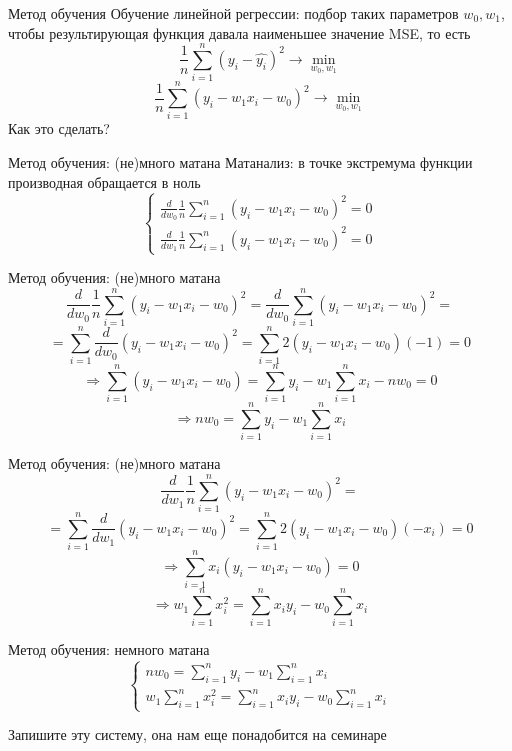 \documentclass[aspectratio=169, professionalfonts]{beamer}
\begin{document}
\begin{frame}{Метод обучения}
    Обучение линейной регрессии: подбор таких параметров \( w_0, w_1 \), чтобы результирующая
    функция давала наименьшее значение MSE, то есть
    {\Large
        \[ \frac{1}{n} \sum_{i=1}^n {(y_i - \hat{y_i})}^2 \rightarrow \min_{w_0, w_1} \]
        \pause
        \[ \frac{1}{n} \sum_{i=1}^n {(y_i - w_1 x_i - w_0 )}^2 \rightarrow \min_{w_0, w_1} \]
    }
    Как это сделать?
\end{frame}

\begin{frame}{Метод обучения: (не)много матана}
    Матанализ: в точке экстремума функции производная обращается в ноль
    {\LARGE \[
        \begin{cases}
            \frac{d}{dw_0} \frac{1}{n} \sum_{i=1}^n {(y_i - w_1 x_i - w_0)}^2 = 0 \\
            \frac{d}{dw_1} \frac{1}{n} \sum_{i=1}^n {(y_i - w_1 x_i - w_0)}^2 = 0 
        \end{cases}
    \]}
\end{frame}

\begin{frame}{Метод обучения: (не)много матана}
    \large
    \[
        \frac{d}{dw_0} \frac{1}{n} \sum_{i=1}^n {(y_i - w_1 x_i - w_0)}^2 =
        \frac{d}{dw_0} \sum_{i=1}^n {(y_i - w_1 x_i - w_0)}^2 =
    \]
    \pause
    \[
        = \sum_{i=1}^n \frac{d}{dw_0} {(y_i - w_1 x_i - w_0)}^2 =
        \sum_{i=1}^n 2 {(y_i - w_1 x_i - w_0)(-1)} = 0
    \]
    \pause
    \[
        \Rightarrow \sum_{i=1}^n (y_i - w_1 x_i - w_0) =
        \sum_{i=1}^n y_i - w_1 \sum_{i=1}^n x_i - n w_0 = 0
    \]
    \pause
    \[
        \Rightarrow n w_0 = \sum_{i=1}^n y_i - w_1 \sum_{i=1}^n x_i
    \]
\end{frame}

\begin{frame}{Метод обучения: (не)много матана}
    \large
    \[ \frac{d}{dw_1} \frac{1}{n} \sum_{i=1}^n {(y_i - w_1 x_i - w_0)}^2 = \]
    \pause
    \[
        = \sum_{i=1}^n \frac{d}{dw_1} {(y_i - w_1 x_i - w_0)}^2 =
        \sum_{i=1}^n 2 {(y_i - w_1 x_i - w_0)(-x_i)} = 0
    \]
    \pause
    \[
        \Rightarrow \sum_{i=1}^n x_i {(y_i - w_1 x_i - w_0)} = 0 
    \]
    \pause
    \[
        \Rightarrow w_1 \sum_{i=1}^n x_i^2 = \sum_{i=1}^n x_i y_i -
        w_0 \sum_{i=1}^n x_i   
    \]
\end{frame}

\begin{frame}{Метод обучения: немного матана}
    \LARGE
    \[
        \begin{cases}
            n w_0 = \sum_{i=1}^n y_i - w_1 \sum_{i=1}^n x_i \\
            w_1 \sum_{i=1}^n x_i^2 = \sum_{i=1}^n x_i y_i -
            w_0 \sum_{i=1}^n x_i
        \end{cases}
    \]

    {\large Запишите эту систему, она нам еще понадобится на семинаре}
\end{frame}
\end{document}
